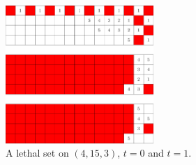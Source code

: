 \begin{figure}[]
\centering
\includegraphics[width=0.5\textwidth]{figures/7/4x15x3_timesteps_numbered_heatmap.pdf}
\caption{A lethal set on $(4,15,3)$, $t=0$ and $t=1$.}
\label{fig:4x15x3_timesteps}
\end{figure}



